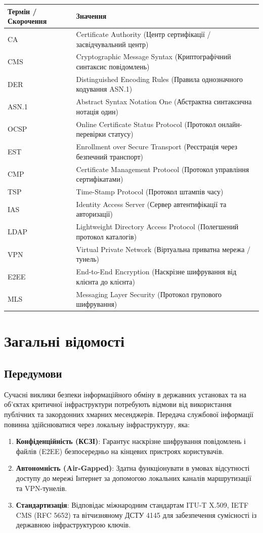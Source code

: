 \documentclass{article}
\begin{document}
\begin{longtable}{p{4cm}p{10cm}}
\toprule
\textbf{Термін / Скорочення} & \textbf{Значення} \\
\midrule
CA & Certificate Authority (Центр сертифікації / засвідчувальний центр) \\
CMS & Cryptographic Message Syntax (Криптографічний синтаксис повідомлень) \\
DER & Distinguished Encoding Rules (Правила однозначного кодування ASN.1) \\
ASN.1 & Abstract Syntax Notation One (Абстрактна синтаксична нотація один) \\
OCSP & Online Certificate Status Protocol (Протокол онлайн-перевірки статусу) \\
EST & Enrollment over Secure Transport (Реєстрація через безпечний транспорт) \\
CMP & Certificate Management Protocol (Протокол управління сертифікатами) \\
TSP & Time-Stamp Protocol (Протокол штампів часу) \\
IAS & Identity Access Server (Сервер автентифікації та авторизації) \\
LDAP & Lightweight Directory Access Protocol (Полегшений протокол каталогів) \\
VPN & Virtual Private Network (Віртуальна приватна мережа / тунель) \\
E2EE & End-to-End Encryption (Наскрізне шифрування від клієнта до клієнта) \\
MLS & Messaging Layer Security (Протокол групового шифрування) \\
\bottomrule
\end{longtable}

\newpage
\section{Загальні відомості}

\subsection{Передумови}
Сучасні виклики безпеки інформаційного обміну в державних установах та на об'єктах критичної інфраструктури потребують відмови від використання публічних та закордонних хмарних месенджерів. Передача службової інформації повинна здійснюватися через локальну інфраструктуру, яка:
\begin{enumerate}
    \item \textbf{Конфіденційність (КСЗІ)}: Гарантує наскрізне шифрування повідомлень і файлів (E2EE) безпосередньо на кінцевих пристроях користувачів.
    \item \textbf{Автономність (Air-Gapped)}: Здатна функціонувати в умовах відсутності доступу до мережі Інтернет за допомогою локальних каналів маршрутизації та VPN-тунелів.
    \item \textbf{Стандартизація}: Відповідає міжнародним стандартам ITU-T X.509, IETF CMS (RFC 5652) та вітчизняному ДСТУ 4145 для забезпечення сумісності із державною інфраструктурою ключів.
\end{enumerate}
\end{document}
